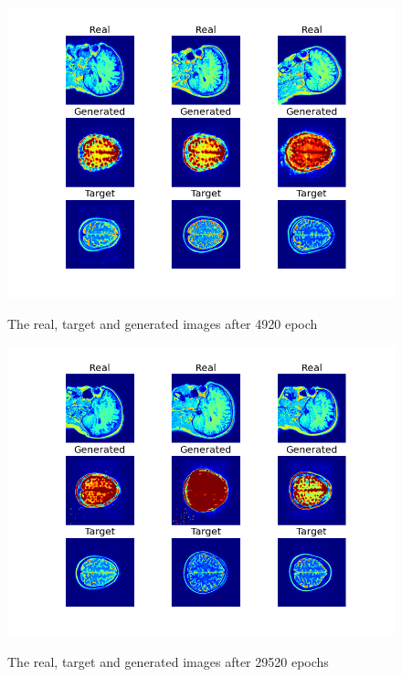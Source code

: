 \documentclass[conference]{IEEEtran}
\begin{document}
\begin{figure}[H]
    \centering
    \includegraphics[width=0.95\columnwidth]{plot_004920.png}
    \label{fig:epoch4920}
    \caption{The real, target and generated images after 4920 epoch}
\end{figure}


\begin{figure}[H]
    \centering
    \includegraphics[width=0.95\columnwidth]{plot_029520.png}
    \label{fig:epoch29520}
    \caption{The real, target and generated images after 29520 epochs}
\end{figure}
\end{document}
